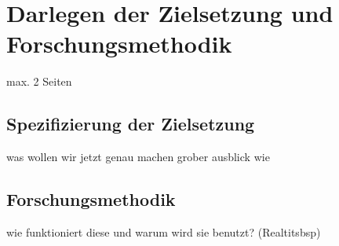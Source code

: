 \chapter{Darlegen der Zielsetzung und Forschungsmethodik}

max. 2 Seiten

\section{Spezifizierung der Zielsetzung}
was wollen wir jetzt genau machen grober ausblick wie

\section{Forschungsmethodik}
wie funktioniert diese und warum wird sie benutzt? (Realtitsbsp)
